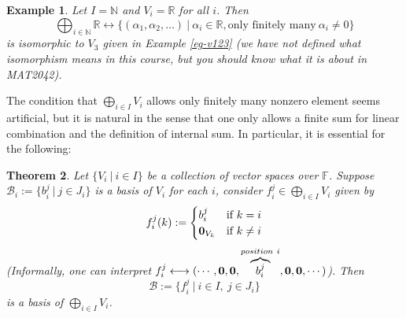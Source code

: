 \documentclass[12pt]{amsbook}
\newtheorem{theorem}{Theorem}[section]
\newtheorem{example}[theorem]{Example}
\begin{document}
\begin{example}
    Let $I = \mathbb{N}$ and $V_i = \mathbb{R}$ for all $i$. Then
    $$\bigoplus_{i \in \mathbb{N}} \mathbb{R} \longleftrightarrow \{(\alpha_1, \alpha_2, \dots)\ |\ \alpha_i \in \mathbb{R}, \text{only finitely many}\ \alpha_i \neq 0\}$$
    is isomorphic to $V_3$ given in Example \ref{eg-v123} (we have not defined what isomorphism means in this course, but you should know what it is about in MAT2042).
\end{example}

The condition that $\bigoplus_{i \in I} V_i$ allows only finitely many nonzero element seems artificial, but it is natural in the sense that one only allows a finite sum for linear combination and the definition of internal sum. In particular, it is essential for the following:
\begin{theorem}
    Let $\{V_i\ |\ i \in I\}$ be a collection of vector spaces over $\mathbb{F}$. Suppose $\mathcal{B}_i := \{b_{i}^j\ |\ j \in J_i\}$ is a basis of $V_i$ for each $i$, consider $f_{i}^j \in \bigoplus_{i \in I} V_i$ given by
    \begin{align*}
f_i^j(k) := \begin{cases} b_i^j  & \text{if}\ k = i\\ 
{\bf 0}_{V_k}  & \text{if}\ k \neq i\end{cases}
    \end{align*}
(Informally, one can interpret $f_i^j \longleftrightarrow (\cdots, {\bf 0},{\bf 0},  \overbrace{b_i^j}^{position\ i}, {\bf 0}, {\bf 0}, \cdots)$). Then
    $$\mathcal{B} := \{f_{i}^{j}\ |\ i \in I,\ j \in J_i\}$$
is a basis of $\bigoplus_{i \in I} V_i$.
\end{theorem}
\end{document}

